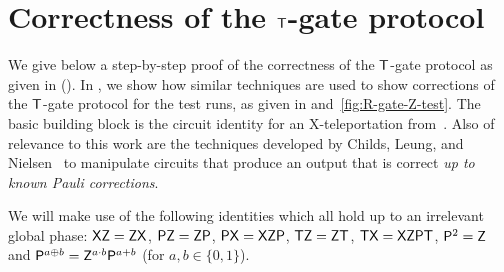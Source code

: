 \documentclass{toc}
\newcommand{\pgate}{{\sf P}}
\newcommand{\rgate}{{\sf T}}
\newcommand{\xgate}{{\sf X}}
\newcommand{\zgate}{{\sf Z}}
\begin{document}
\section{Correctness of the \texorpdfstring{$\rgate$}{T}-gate protocol}
\label{sec:correctness-R-gate}
%

\normalfont
We give below a step-by-step proof of the correctness of the
$\rgate$-gate protocol as given in  ().
%
In  , we show how similar techniques are used to show corrections of the $\rgate$-gate protocol for the test runs, as given in  and~\ref{fig:R-gate-Z-test}. The basic
building block is the circuit identity for an \xgate-teleportation
from~\cite{ZLC00}. Also of relevance to
this work are the techniques developed by Childs, Leung, and
Nielsen~\cite{CLN05} to manipulate circuits that produce an output
that is correct \emph{up to known Pauli corrections}.

We will make use of the following identities which all hold up to an
irrelevant global phase: $ \xgate \zgate = \zgate \xgate$, $\pgate
\zgate = \zgate \pgate$, $\pgate \xgate = \xgate \zgate \pgate$,
$\rgate \zgate = \zgate \rgate$, $\rgate \xgate = \xgate \zgate
\pgate \rgate$,  $\pgate^2  = \zgate$ and $\pgate^{a\oplus b} =
\zgate^{a\cdot b} \pgate^{a + b}$ (for $a, b \in \{0,1\}$).
\end{document}

